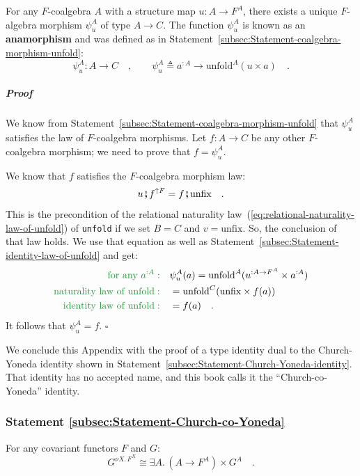 For any $F$-coalgebra $A$ with a structure map $u:A\rightarrow F^{A}$,
there exists a unique $F$-algebra morphism $\psi_{u}^{A}$ of type
$A\rightarrow C$. The function $\psi_{u}^{A}$ is known as an \textbf{anamorphism}
and was defined as in Statement~\ref{subsec:Statement-coalgebra-morphism-unfold}:
\[
\psi_{u}^{A}:A\rightarrow C\quad,\quad\quad\psi_{u}^{A}\triangleq a^{:A}\rightarrow\text{unfold}^{A}(u\times a)\quad.
\]


\subparagraph{Proof}

We know from Statement~\ref{subsec:Statement-coalgebra-morphism-unfold}
that $\psi_{u}^{A}$ satisfies the law of $F$-coalgebra morphisms.
Let $f:A\rightarrow C$ be any other $F$-coalgebra morphism; we need
to prove that $f=\psi_{u}^{A}$.

We know that $f$ satisfies the $F$-coalgebra morphism law:
\[
u\bef f^{\uparrow F}=f\bef\text{unfix}\quad.
\]
This is the precondition of the relational naturality law~(\ref{eq:relational-naturality-law-of-unfold})
of \lstinline!unfold! if we set $B=C$ and $v=\text{unfix}$. So,
the conclusion of that law holds. We use that equation as well as
Statement~\ref{subsec:Statement-identity-law-of-unfold} and get:
\begin{align*}
{\color{greenunder}\text{for any }a^{:A}:}\quad & \psi_{u}^{A}(a)=\text{unfold}^{A}(u^{:A\rightarrow F^{A}}\times a^{:A})\\
{\color{greenunder}\text{naturality law of }\text{unfold}:}\quad & =\text{unfold}^{C}(\text{unfix}\times f(a))\\
{\color{greenunder}\text{identity law of }\text{unfold}:}\quad & =f(a)\quad.
\end{align*}
It follows that $\psi_{u}^{A}=f$. $\square$

We conclude this Appendix with the proof of a type identity dual to
the Church-Yoneda identity shown
in Statement~\ref{subsec:Statement-Church-Yoneda-identity}. That
identity has no accepted name, and this book calls it the \textsf{``}Church-co-Yoneda\textsf{''}
identity.

\subsubsection{Statement \label{subsec:Statement-Church-co-Yoneda}\ref{subsec:Statement-Church-co-Yoneda}}

For any covariant functors $F$ and $G$:
\[
G^{\nu X.\,F^{X}}\cong\exists A.\,(A\rightarrow F^{A})\times G^{A}\quad.
\]


